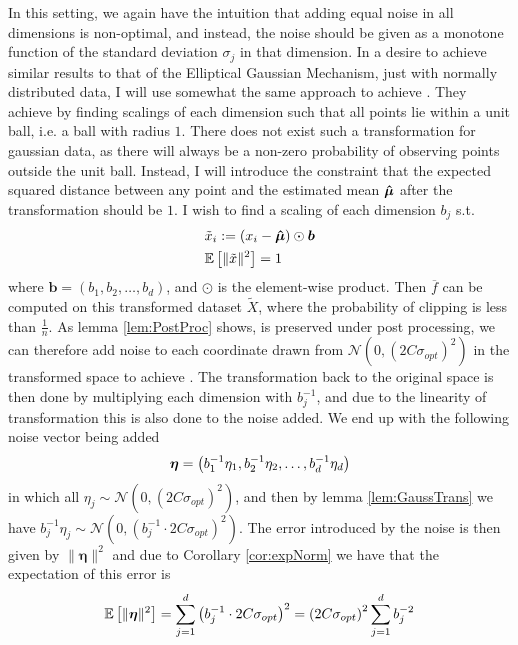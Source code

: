 \documentclass[a4paper,12pt]{article}
\begin{document}
In this setting, we again have the intuition that adding equal noise in all dimensions is non-optimal, and instead, the noise should be given as a monotone function
of the standard deviation $\sigma_j$ in that dimension. In a desire to achieve similar results to that of the Elliptical Gaussian Mechanism, just with normally distributed data,
I will use somewhat the same approach to achieve \edp.
They achieve \edp by finding scalings of each dimension such that all points lie within a unit ball, i.e. a ball with radius $1$. 
There does not exist such a transformation for gaussian data, as there will always be a non-zero 
probability of observing points outside the unit ball.
Instead, I will introduce the constraint that the expected squared distance between any point and the estimated mean $\bm{\hat{\mu}}$ after the transformation should be $1$. 
I wish to find a scaling of each dimension $b_j$ s.t.
\begin{align}
\nonumber
    &\tilde{x}_i := (x_i - \bm{\hat{\mu}}) \odot \bm{b} \\
\label{eq:Alg3Con}
    &\mathbb{E} \left [ \| \tilde{x} \|^2 \right] = 1
\end{align}
where $\bm{b} = (b_1, b_2, \dots, b_d)$, and $\odot$ is the element-wise product. 
Then $\overline{f}$ can be computed on this transformed dataset $\tilde{X}$, where the probability of clipping is less than $\frac{1}{n}$.
As lemma \ref{lem:PostProc} shows, \edp is preserved under post processing, 
we can therefore add noise to each coordinate drawn from $\mathcal{N}(0,(2C\sigma_{opt})^2)$ in the transformed space to achieve \edp.
The transformation back to the original space is then done by multiplying each dimension with $b_j^{-1}$, and due to the linearity of transformation 
this is also done to the noise added.
We end up with the following noise vector being added
\[
    \bm{\eta} = \left ( b_1^{-1}\eta_1, b_2^{-1}\eta_2, \dots, b_d^{-1}\eta_d \right)
\]
in which all $\eta_j \sim \mathcal{N}(0,(2C\sigma_{opt})^2)$, and then by lemma \ref{lem:GaussTrans} we have $b_j^{-1}\eta_j \sim \mathcal{N}(0, (b_j^{-1} \cdot 2C\sigma_{opt})^2)$.
The error introduced by the noise is then given by $\| \bm{\eta} \|^2$ and due to Corollary \ref{cor:expNorm} we have that the expectation of this error is 
\begin{equation}
\label{eq:Alg3Err}
    \mathbb{E} \left [ \| \bm{\eta} \|^2 \right] = \sum_{j=1}^d \left (b_j^{-1} \cdot 2C\sigma_{opt}\right)^2   = \left (2C\sigma_{opt}\right)^2 \sum_{j=1}^d b_j^{-2}
\end{equation}
\end{document}
